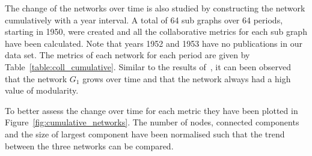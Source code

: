 \documentclass{article}
\theoremstyle{definition}
\begin{document}
The change of the networks over time is also studied by constructing the network
cumulatively with a year interval. A total of 64 sub graphs
over 64 periods, starting in 1950, were created and all the collaborative metrics
for each sub graph have been calculated. Note that years 1952 and 1953 have no
publications in our data set. The metrics of each network for each period are given by
Table~\ref{table:coll_cumulative}.
Similar to the results of~\cite{Liu2015}, it can been observed that the network \(G_1\)
grows over time and that the network always had a high value of modularity.

\begin{table}[!hbtp]
    \centering
    \begin{adjustbox}{totalheight=.8\baselineskip, width=\textwidth}
    }
    \caption{Collaborativeness metrics for cumulative graphs.}\label{table:coll_cumulative}
\end{adjustbox}
\end{table}

\begin{table}[!hbtp]
    \centering
    \begin{adjustbox}{totalheight=\baselineskip, width=\textwidth}
    }
    \caption{Collaborativeness metrics for cumulative graphs' main clusters.}\label{table:clusters_cumulative}
\end{adjustbox}
\end{table}

To better assess the change over time for each metric they have been plotted in
Figure~\ref{fig:cumulative_networks}. The number of nodes, connected components
and the size of largest component have been normalised such that the trend between
the three networks can be compared.
\end{document}

